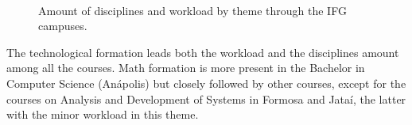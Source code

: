 \documentclass[sigconf, review]{educomp}
\begin{document}
~
\begin{figure}[!htbp]
    \centering
    \qquad
    \caption{Amount of disciplines and workload by theme through the IFG campuses.}%
    \label{fig_themes}%
\end{figure}
The technological formation leads both the workload and the disciplines amount among all the courses.
Math formation is more present in the Bachelor in Computer Science (Anápolis) but closely followed by other courses, except for the courses on Analysis and Development of Systems in Formosa and Jataí, the latter with the minor workload in this theme.
\end{document}
